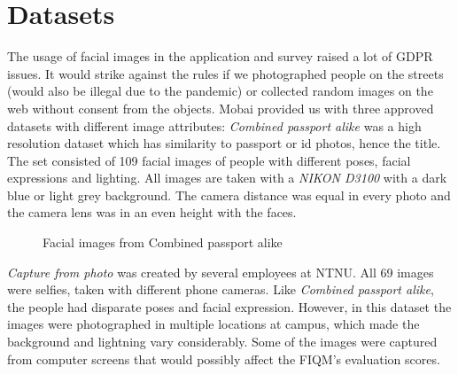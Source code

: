 \section{Datasets}
\label{sec:datasets}
The usage of facial images in the application and survey raised a lot of GDPR issues. It would strike against the rules if we photographed people on the streets (would also be illegal due to the pandemic) or collected random images on the web without consent from the objects. Mobai provided us with three approved datasets with different image attributes: \textit{Combined passport alike} was a high resolution dataset which has similarity to passport or id photos, hence the title. The set consisted of 109 facial images of people with different poses, facial expressions and lighting. All images are taken with a \textit{NIKON D3100} with a dark blue or light grey background. The camera distance was equal in every photo and the camera lens was in an even height with the faces. 
\begin{figure}[h]
    \centering
    \qquad
    \caption{Facial images from Combined passport alike}
    \label{fig:combined_passport_alike}
\end{figure}
% 
\textit{Capture from photo} was created by several employees at NTNU. All 69 images were selfies, taken with different phone cameras. Like \textit{Combined passport alike}, the people had disparate poses and facial expression. However, in this dataset the images were photographed in multiple locations at campus, which made the background and lightning vary considerably. Some of the images were captured from computer screens that would possibly affect the FIQM's evaluation scores. \newpage
